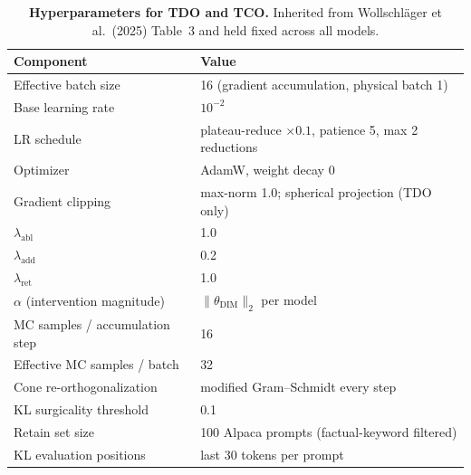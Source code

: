 %
\begin{table}[!ht]
\centering
\caption{%
\textbf{Hyperparameters for TDO and TCO.} Inherited from
Wollschläger et al.~(2025) Table~3 and held fixed across all models.}
\label{tab:hyperparams}
\small
\begin{tabular}{ll}
\toprule
Component & Value \\
\midrule
Effective batch size            & 16 (gradient accumulation, physical batch 1) \\
Base learning rate              & $10^{-2}$ \\
LR schedule                     & plateau-reduce $\times 0.1$, patience 5, max 2 reductions \\
Optimizer                       & AdamW, weight decay 0 \\
Gradient clipping               & max-norm 1.0; spherical projection (TDO only) \\
$\lambda_{\text{abl}}$          & 1.0 \\
$\lambda_{\text{add}}$          & 0.2 \\
$\lambda_{\text{ret}}$          & 1.0 \\
$\alpha$ (intervention magnitude) & $\|\theta_{\text{DIM}}\|_{2}$ per model \\
MC samples / accumulation step  & 16 \\
Effective MC samples / batch    & 32 \\
Cone re-orthogonalization       & modified Gram--Schmidt every step \\
KL surgicality threshold        & 0.1 \\
Retain set size                 & 100 Alpaca prompts (factual-keyword filtered) \\
KL evaluation positions         & last 30 tokens per prompt \\
\bottomrule
\end{tabular}
\end{table}
